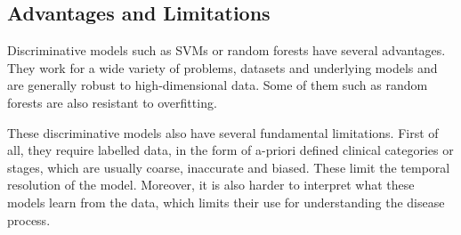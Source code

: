 \subsection{Advantages and Limitations}

Discriminative models such as SVMs or random forests have several advantages. They work for a wide variety of problems, datasets and underlying models and are generally robust to high-dimensional data. Some of them such as random forests are also resistant to overfitting.

These discriminative models also have several fundamental limitations. First of all, they require labelled data, in the form of a-priori defined clinical categories or stages, which are usually coarse, inaccurate and biased. These limit the temporal resolution of the model. Moreover, it is also harder to interpret what these models learn from the data, which limits their use for understanding the disease process.

